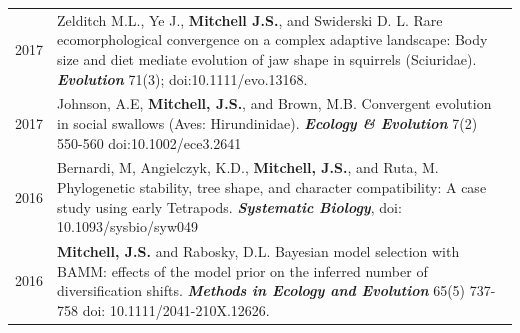 \documentclass[a4paper, oneside, final]{scrartcl} %
\newcommand{\gray}{\rowcolor[gray]{.90}} %
\begin{document}
\begin{center}
\begin{tabularx}{0.97\linewidth}{>{\raggedleft\scshape}p{2cm}X}
\gray 2017 & Zelditch M.L., Ye J., \textbf{Mitchell J.S.}, and Swiderski D. L. Rare ecomorphological convergence on a complex adaptive landscape: Body size and diet mediate evolution of jaw shape in squirrels (Sciuridae). \textbf{\textit{Evolution}} 71(3); doi:10.1111/evo.13168. \\ 
2017 & Johnson, A.E, \textbf{Mitchell, J.S.}, and Brown, M.B. Convergent evolution in social swallows (Aves: Hirundinidae). \textbf{\textit{Ecology \& Evolution}} 7(2) 550-560 doi:10.1002/ece3.2641 \\
 \gray 2016 & Bernardi, M, Angielczyk, K.D., \textbf{Mitchell, J.S.}, and Ruta, M. Phylogenetic stability, tree shape, and character compatibility: A case study using early Tetrapods. \textbf{\textit{Systematic Biology}}, doi: 10.1093/sysbio/syw049 \\
2016 & \textbf{Mitchell, J.S.} and Rabosky, D.L. Bayesian model selection with BAMM: effects of the model prior on the inferred number of diversification shifts. \textbf{\textit{Methods in Ecology and Evolution}} 65(5) 737-758 doi: 10.1111/2041-210X.12626. \\
\end{tabularx}


\end{center}
\end{document}

